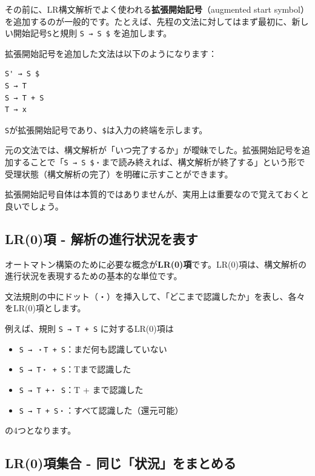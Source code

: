 その前に、LR構文解析でよく使われる\textbf{拡張開始記号}（augmented start
symbol）を追加するのが一般的です。たとえば、先程の文法に対してはまず最初に、新しい開始記号\texttt{S\textquotesingle{}}と規則
\texttt{S\textquotesingle{}\ →\ S\ \$} を追加します。

拡張開始記号を追加した文法は以下のようになります：

\begin{verbatim}
S' → S $
S → T
S → T + S
T → x
\end{verbatim}

\texttt{S\textquotesingle{}}が拡張開始記号であり、\texttt{\$}は入力の終端を示します。

元の文法では、構文解析が「いつ完了するか」が曖昧でした。拡張開始記号を追加することで「\texttt{S\textquotesingle{}\ →\ S\ \$・}まで読み終えれば、構文解析が終了する」という形で受理状態（構文解析の完了）を明確に示すことができます。

拡張開始記号自体は本質的ではありませんが、実用上は重要なので覚えておくと良いでしょう。

\hypertarget{chapter5-lr0ux9805---ux89e3ux6790ux306eux9032ux884cux72b6ux6cc1ux3092ux8868ux3059}{%
\subsection{LR(0)項 -
解析の進行状況を表す}\label{chapter5-lr0ux9805---ux89e3ux6790ux306eux9032ux884cux72b6ux6cc1ux3092ux8868ux3059}}

オートマトン構築のために必要な概念が\textbf{LR(0)項}です。LR(0)項は、構文解析の進行状況を表現するための基本的な単位です。

文法規則の中にドット（・）を挿入して、「どこまで認識したか」を表し、各々をLR(0)項とします。

例えば、規則 \texttt{S\ →\ T\ +\ S} に対するLR(0)項は

\begin{itemize}
\tightlist
\item
  \texttt{S\ →\ ・T\ +\ S}：まだ何も認識していない
\item
  \texttt{S\ →\ T・\ +\ S}：Tまで認識した
\item
  \texttt{S\ →\ T\ +・\ S}：T + まで認識した
\item
  \texttt{S\ →\ T\ +\ S・}：すべて認識した（還元可能）
\end{itemize}

の4つとなります。

\hypertarget{chapter5-lr0ux9805ux96c6ux5408---ux540cux3058ux72b6ux6cc1ux3092ux307eux3068ux3081ux308b}{%
\subsection{LR(0)項集合 -
同じ「状況」をまとめる}\label{chapter5-lr0ux9805ux96c6ux5408---ux540cux3058ux72b6ux6cc1ux3092ux307eux3068ux3081ux308b}}

